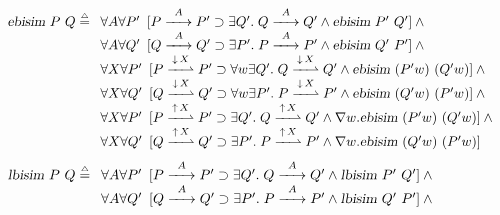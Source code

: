 \documentclass{acmtrans2m}
\newcommand{\ebisim}[2]{\hbox{\sl ebisim}~#1~#2}
\newcommand{\lbisim}[2]{\hbox{\sl lbisim}~#1~#2}
\newcommand{\defeq}{\mathrel{\stackrel{{\scriptscriptstyle\triangle}}{=}}}
\newcommand{\iand}{\wedge}
\newcommand{\iexists}{\exists}
\newcommand{\iforall}{\forall}
\newcommand{\iimp}{\supset}
\newcommand{\inact}{\mathop{\downarrow}}
\newcommand{\one  }[3]{#1\stackrel{#2}{-\!\!-\!\!\!\rightarrow    } #3}
\newcommand{\onep }[3]{#1\stackrel{#2}{-\!\!-\!\!\!\rightharpoonup} #3}
\newcommand{\outact}{\mathop{\uparrow}}
\begin{document}
\begin{figure}
{\small
$$
\ebisim{P}{Q}\defeq
\begin{array}[t]{l}
 \iforall A\iforall P'
    \begin{array}[t]{l}
      [\one{P}{A}{P'}\iimp\iexists Q'.\;\one{Q}{A}{Q'}
       \iand \ebisim{P'}{Q'}]\iand\null
    \end{array} \\
 \iforall A \iforall Q'
    \begin{array}[t]{l}
      [\one{Q}{A}{Q'}\iimp\iexists P'.\;\one{P}{A}{P'}
         \null\iand \ebisim{Q'}{P'}]\iand\null
    \end{array} \\    
 \iforall X\iforall P'
        \begin{array}[t]{l}
        [\onep{P}{\inact X}{P'}\iimp
         \forall w \iexists Q'.\;\onep{Q}{\inact X}{Q'}
          \iand \ebisim{(P'w)}{(Q' w)}]\iand \null          
    \end{array} \\    
 \iforall X\iforall Q'
        \begin{array}[t]{l}
        [\onep{Q}{\inact X}{Q'}\iimp
         \forall w  \iexists P'.\;\onep{P}{\inact X}{P'}
         \null\iand \ebisim{(Q' w)}{(P' w)}]\iand \null          
    \end{array} \\    
 \iforall X \iforall P'
    \begin{array}[t]{l}
      [\onep{P}{\outact X}{P'}\iimp\iexists Q'.\;\onep{Q}{\outact X}{Q'}
         \null\iand\nabla w. \ebisim{(P' w)}{(Q' w)}]\iand\null
    \end{array}\\
 \iforall X \iforall Q'
    \begin{array}[t]{l}
      [\onep{Q}{\outact X}{Q'}\iimp\iexists P'.\;\onep{P}{\outact X}{P'}
         \null\iand\nabla w. \ebisim{(Q' w)}{(P' w)}]\quad
    \end{array}    
\end{array}
$$
$$
\lbisim{P}{Q}\defeq
\begin{array}[t]{l}
 \iforall A\iforall P'
    \begin{array}[t]{l}
      [\one{P}{A}{P'}\iimp\iexists Q'.\;\one{Q}{A}{Q'}
         \null\iand \lbisim{P'}{Q'}]\iand\null
    \end{array} \\
 \iforall A\iforall Q'
    \begin{array}[t]{l}
      [\one{Q}{A}{Q'}\iimp\iexists P'.\;\one{P}{A}{P'}
         \iand \lbisim{Q'}{P'}]\iand\null

\end{array}
\end{array}$$}
\end{figure}
\end{document}
